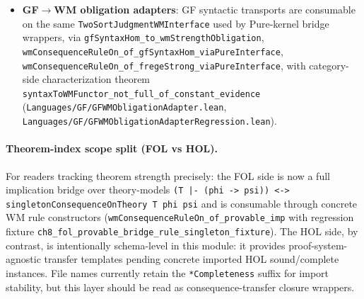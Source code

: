 \documentclass[]{article}
\newcommand{\code}[1]{\texttt{#1}}
\begin{document}
\begin{itemize}[leftmargin=2em]
  \code{modalSubobject\_commDi\_bc\_graph\_endpoint\_of\_pathSemLiftPkg},
  \code{mettaFull\_modalSubobject\_commDi\_bc\_graph\_endpoint},
  \code{oslf\_formula\_ntt\_graph\_triangle\_categorical}. The closure layer
  now also exposes an evidence-first endpoint
  \code{semE\_fragment\_formulaCategoricalEndpoint\_step} plus regression
  projection
  \code{semE\_fragment\_categorical\_endpoint\_step\_fixture}, so the
  institution/Beck-Chevalley endpoint and one-step semE evidence closure are
  consumable together before any strength-view lift assumptions. Direct
  fixtures include
  regression fixtures
  \code{formula\_graph\_triangle\_fixture} and
  \code{formula\_graph\_triangle\_categorical\_fixture}
  (\code{OSLF/Framework/ModalSubobjectBridge.lean},
   \code{OSLF/Framework/OSLFNTTWMBridge.lean},
   \code{OSLF/Framework/OSLFNTTTheoryClosure.lean},
   \code{OSLF/Framework/OSLFNTTWMBridgeRegression.lean}).
\item \textbf{GF$\rightarrow$WM obligation adapters}:
  GF syntactic transports are consumable on the same
  \code{TwoSortJudgmentWMInterface} used by Pure-kernel bridge wrappers,
  via
  \code{gfSyntaxHom\_to\_wmStrengthObligation},
  \code{wmConsequenceRuleOn\_of\_gfSyntaxHom\_viaPureInterface},
  \code{wmConsequenceRuleOn\_of\_fregeStrong\_viaPureInterface}, with
  category-side characterization theorem
  \code{syntaxToWMFunctor\_not\_full\_of\_constant\_evidence}
  (\code{Languages/GF/GFWMObligationAdapter.lean},
   \code{Languages/GF/GFWMObligationAdapterRegression.lean}).
\end{itemize}

\paragraph{Theorem-index scope split (FOL vs HOL).}
For readers tracking theorem strength precisely: the FOL side is now a full
implication bridge over theory-models
\code{(T |- (phi -> psi)) <-> singletonConsequenceOnTheory T phi psi}
and is consumable through concrete WM rule constructors
(\code{wmConsequenceRuleOn\_of\_provable\_imp} with regression fixture
\code{ch8\_fol\_provable\_bridge\_rule\_singleton\_fixture}). The HOL side, by
contrast, is intentionally schema-level in this module: it provides
proof-system-agnostic transfer templates pending concrete imported HOL
sound/complete instances. File names currently retain the
\code{*Completeness} suffix for import stability, but this layer should be
read as consequence-transfer closure wrappers.
\end{document}
